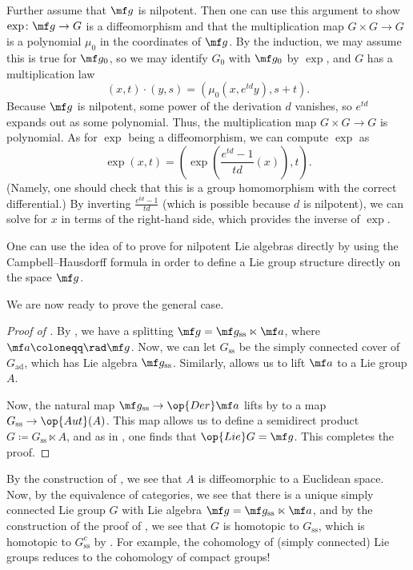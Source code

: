 \documentclass[../notes.tex]{subfiles}
\begin{document}
\begin{remark} \label{rem:nilpotent-lie-3}
	Further assume that $\mf g$ is nilpotent. Then one can use this argument to show $\exp\colon\mf g\to G$ is a diffeomorphism and that the multiplication map $G\times G\to G$ is a polynomial $\mu_0$ in the coordinates of $\mf g$. By the induction, we may assume this is true for $\mf g_0$, so we may identify $G_0$ with $\mf g_0$ by $\exp$, and $G$ has a multiplication law
	\[(x,t)\cdot(y,s)=\left(\mu_0(x,e^{td}y),s+t\right).\]
	Because $\mf g$ is nilpotent, some power of the derivation $d$ vanishes, so $e^{td}$ expands out as some polynomial. Thus, the multiplication map $G\times G\to G$ is polynomial. As for $\exp$ being a diffeomorphism, we can compute $\exp$ as
	\[\exp(x,t)=\left(\exp\left(\frac{e^{td}-1}{td}(x)\right),t\right).\]
	(Namely, one should check that this is a group homomorphism with the correct differential.) By inverting $\frac{e^{td}-1}{td}$ (which is possible because $d$ is nilpotent), we can solve for $x$ in terms of the right-hand side, which provides the inverse of $\exp$.
\end{remark}
\begin{remark}
	One can use the idea of  to prove  for nilpotent Lie algebras directly by using the Campbell--Hausdorff formula in order to define a Lie group structure directly on the space $\mf g$.
\end{remark}
We are now ready to prove the general case.
\begin{proof}[Proof of ]
	By , we have a splitting $\mf g=\mf g_{\mathrm{ss}}\ltimes\mf a$, where $\mf a\coloneqq\rad\mf g$. Now, we can let $G_{\mathrm{ss}}$ be the simply connected cover of $G_{\mathrm{ad}}$, which has Lie algebra $\mf g_{\mathrm{ss}}$. Similarly,  allows us to lift $\mf a$ to a Lie group $A$.

	Now, the natural map $\mf g_{\mathrm{ss}}\to\op{Der}\mf a$ lifts by  to a map $G_{\mathrm{ss}}\to\op{Aut}(A)$. This map allows us to define a semidirect product $G\coloneqq G_{\mathrm{ss}}\ltimes A$, and as in , one finds that $\op{Lie}G=\mf g$. This completes the proof.
\end{proof}
\begin{remark}
	By the construction of , we see that $A$ is diffeomorphic to a Euclidean space. Now, by the equivalence of categories, we see that there is a unique simply connected Lie group $G$ with Lie algebra $\mf g=\mf g_{\mathrm{ss}}\ltimes\mf a$, and by the construction of the proof of , we see that $G$ is homotopic to $G_{\mathrm{ss}}$, which is homotopic to $G_{\mathrm{ss}}^c$ by . For example, the cohomology of (simply connected) Lie groups reduces to the cohomology of compact groups!
\end{remark}
\end{document}
